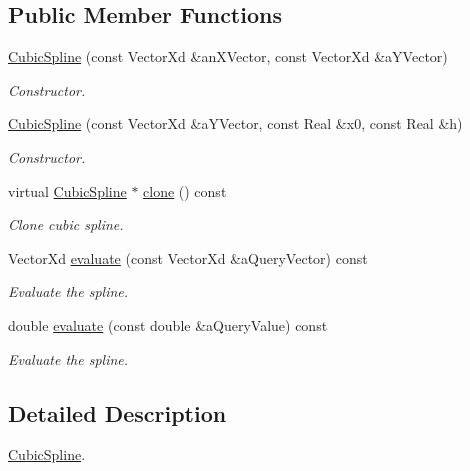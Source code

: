 \subsection*{Public Member Functions}
\begin{DoxyCompactItemize}
\item 
\hyperlink{classostk_1_1math_1_1curvefitting_1_1interp_1_1_cubic_spline_a6193f35fae4f27ef042c3895f4d1e341}{Cubic\+Spline} (const Vector\+Xd \&an\+X\+Vector, const Vector\+Xd \&a\+Y\+Vector)
\begin{DoxyCompactList}\small\item\em Constructor. \end{DoxyCompactList}\item 
\hyperlink{classostk_1_1math_1_1curvefitting_1_1interp_1_1_cubic_spline_acf1a047eb5cd1441f22f67e86fa1a1af}{Cubic\+Spline} (const Vector\+Xd \&a\+Y\+Vector, const Real \&x0, const Real \&h)
\begin{DoxyCompactList}\small\item\em Constructor. \end{DoxyCompactList}\item 
virtual \hyperlink{classostk_1_1math_1_1curvefitting_1_1interp_1_1_cubic_spline}{Cubic\+Spline} $\ast$ \hyperlink{classostk_1_1math_1_1curvefitting_1_1interp_1_1_cubic_spline_a43d9d4ff7c386a5f3442dc8a617aa0cc}{clone} () const
\begin{DoxyCompactList}\small\item\em Clone cubic spline. \end{DoxyCompactList}\item 
Vector\+Xd \hyperlink{classostk_1_1math_1_1curvefitting_1_1interp_1_1_cubic_spline_a69c23827173fe8ee587d468551246fd9}{evaluate} (const Vector\+Xd \&a\+Query\+Vector) const
\begin{DoxyCompactList}\small\item\em Evaluate the spline. \end{DoxyCompactList}\item 
double \hyperlink{classostk_1_1math_1_1curvefitting_1_1interp_1_1_cubic_spline_a9cd7d809db55125256a73582cb040e4f}{evaluate} (const double \&a\+Query\+Value) const
\begin{DoxyCompactList}\small\item\em Evaluate the spline. \end{DoxyCompactList}\end{DoxyCompactItemize}


\subsection{Detailed Description}
\hyperlink{classostk_1_1math_1_1curvefitting_1_1interp_1_1_cubic_spline}{Cubic\+Spline}. 

